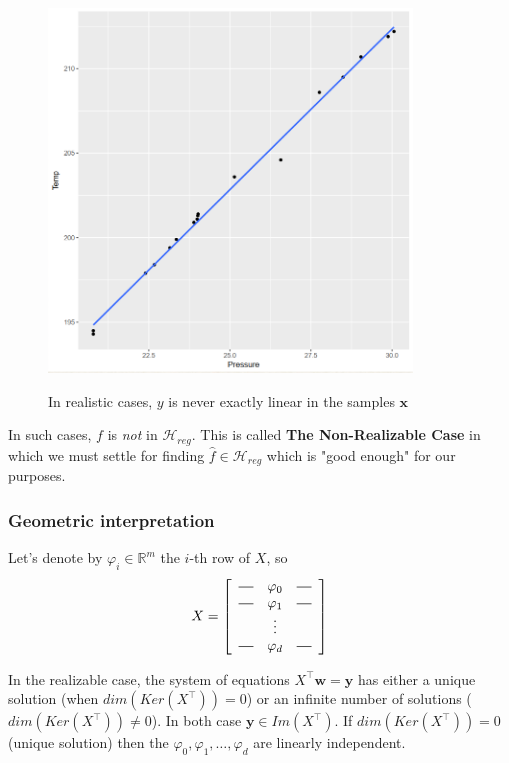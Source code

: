 \documentclass[11pt]{article}
\newcommand*{\horzbar}{\rule[.5ex]{2.5ex}{0.5pt}}
\newcommand{\R}{\ensuremath{\mathbb{R}}}
\newcommand{\Tr}{\ensuremath{\top}}
\newcommand{\Hc}{\mathcal{H}}
\begin{document}
\begin{figure}[h!]
  \centering
    \includegraphics[width=3.8in]{forbes.png} \\
 \caption{In realistic cases, $y$ is never exactly linear in the samples $\mathbf{x}$}
\end{figure}

In such cases, $f$ is \textit{not} in  $\Hc_{reg}$. This is called \textbf{The Non-Realizable Case} in which we must  settle for finding $\hat{f} \in \Hc_{reg}$ which is "good enough" for our purposes.


\subsubsection{Geometric interpretation}

Let's denote by $\varphi_i\in \R^m$ the $i$-th row of $X$, so
    \[
 X =
\left[
  \begin{array}{ccc}
    \horzbar & \varphi_{0} & \horzbar \\
    \horzbar &\varphi_{1} & \horzbar \\
   & \vdots    & \\
   \horzbar & \varphi_{d} & \horzbar
  \end{array}
\right]
\]

In the realizable case, the system of equations $X^\Tr \mathbf{w}=\mathbf{y}$ has either a unique solution (when $dim(Ker(X^\Tr))=0$) or an infinite number of solutions ($dim(Ker(X^\Tr))\neq 0$).
In both case $\mathbf{y}\in Im(X^\Tr)$. If $dim(Ker(X^\Tr))=0$ (unique solution) then the $\varphi_0,\varphi_1,\ldots,\varphi_d$ are linearly independent.
\end{document}
